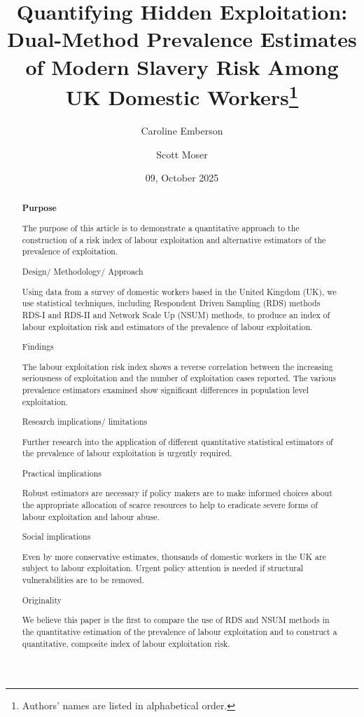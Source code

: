 \documentclass[
  12pt,
  letterpaper,
  DIV=11,
  numbers=noendperiod]{scrartcl}
\title{Quantifying Hidden Exploitation: Dual-Method Prevalence Estimates
of Modern Slavery Risk Among UK Domestic Workers\footnote{Authors' names
  are listed in alphabetical order.}}
\author{Caroline Emberson \and Scott Moser}
\date{09, October 2025}
\theoremstyle{plain}
\theoremstyle{definition}
\renewcommand*\contentsname{Table of contents}
\newcommand\contentsname{Table of contents}
\begin{document}
\maketitle
\begin{abstract}
\textbf{Purpose}

The purpose of this article is to demonstrate a quantitative approach to
the construction of a risk index of labour exploitation and alternative
estimators of the prevalence of exploitation.

Design/ Methodology/ Approach

Using data from a survey of domestic workers based in the United Kingdom
(UK), we use statistical techniques, including Respondent Driven
Sampling (RDS) methods RDS-I and RDS-II and Network Scale Up (NSUM)
methods, to produce an index of labour exploitation risk and estimators
of the prevalence of labour exploitation.

Findings

The labour exploitation risk index shows a reverse correlation between
the increasing seriousness of exploitation and the number of
exploitation cases reported. The various prevalence estimators examined
show significant differences in population level exploitation.

Research implications/ limitations

Further research into the application of different quantitative
statistical estimators of the prevalence of labour exploitation is
urgently required.

Practical implications

Robust estimators are necessary if policy makers are to make informed
choices about the appropriate allocation of scarce resources to help to
eradicate severe forms of labour exploitation and labour abuse.

Social implications

Even by more conservative estimates, thousands of domestic workers in
the UK are subject to labour exploitation. Urgent policy attention is
needed if structural vulnerabilities are to be removed.

Originality

We believe this paper is the first to compare the use of RDS and NSUM
methods in the quantitative estimation of the prevalence of labour
exploitation and to construct a quantitative, composite index of labour
exploitation risk.
\end{abstract}

\renewcommand*\contentsname{Table of contents}
{
\hypersetup{linkcolor=}
\setcounter{tocdepth}{3}
\tableofcontents
}
\end{document}
